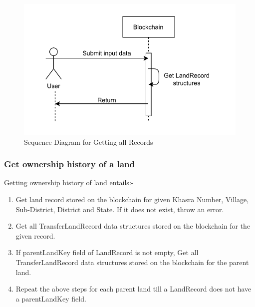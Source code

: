 \documentclass[12pt]{article}
\begin{document}
        \begin{figure}[htbp]
            \includegraphics[scale=0.25]{blockchain_seq_get_records}
            \centering
            \caption{Sequence Diagram for Getting all Records}
        \end{figure}


    \subsubsection{Get ownership history of a land}
        Getting ownership history of land entails:-
        \begin{enumerate}
            \item Get land record stored on the blockchain for given Khasra Number, Village, Sub-District, District and State. If it does not exist, throw an error.
            \item Get all TransferLandRecord data structures stored on the blockchain for the given record.
            \item If parentLandKey field of LandRecord is not empty, Get all TransferLandRecord data structures stored on the blockchain for the parent land.
            \item Repeat the above steps for each parent land till a LandRecord does not have a parentLandKey field. 
        \end{enumerate}
\end{document}

